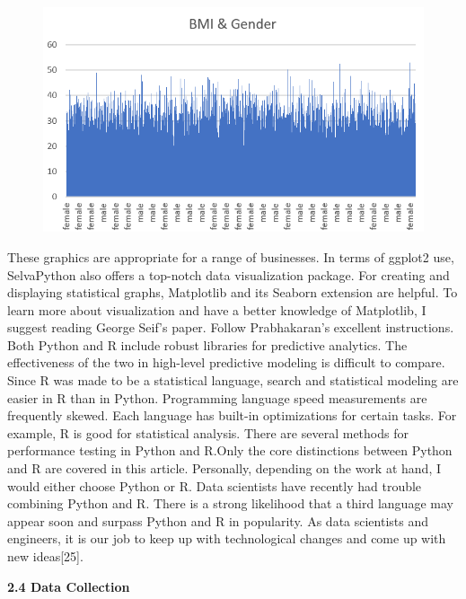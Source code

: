 \documentclass[journal]{IEEEtran}
\begin{document}
\begin{figure}[h]
  \centering
  \includegraphics [width= 3.55 in]{3.png}
\caption{}
  \label{storage}
\end{figure}


\par These graphics are appropriate for a range of businesses. In terms of ggplot2 use, SelvaPython also offers a top-notch data visualization package. For creating and displaying statistical graphs, Matplotlib and its Seaborn extension are helpful. To learn more about visualization and have a better knowledge of Matplotlib, I suggest reading George Seif's paper. Follow Prabhakaran's excellent instructions. Both Python and R include robust libraries for predictive analytics. The effectiveness of the two in high-level predictive modeling is difficult to compare. Since R was made to be a statistical language, search and statistical modeling are easier in R than in Python. Programming language speed measurements are frequently skewed. Each language has built-in optimizations for certain tasks. For example, R is good for statistical analysis. There are several methods for performance testing in Python and R.Only the core distinctions between Python and R are covered in this article. Personally, depending on the work at hand, I would either choose Python or R. Data scientists have recently had trouble combining Python and R. There is a strong likelihood that a third language may appear soon and surpass Python and R in popularity. As data scientists and engineers, it is our job to keep up with technological changes and come up with new ideas[25].


\textbf{2.4  Data Collection }
\end{document}

